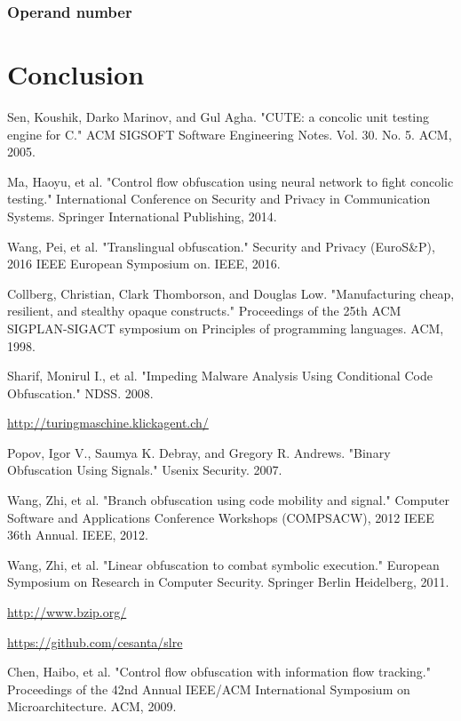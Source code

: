 \documentclass[lnicst]{svmultln}
\begin{document}
\subsubsection{Operand number}

\section{Conclusion}
 

%
%
\begin{thebibliography}{5}

 Sen, Koushik, Darko Marinov, and Gul Agha. "CUTE: a concolic unit testing engine for C." ACM SIGSOFT Software Engineering Notes. Vol. 30. No. 5. ACM, 2005.

 Ma, Haoyu, et al. "Control flow obfuscation using neural network to fight concolic testing." International Conference on Security and Privacy in Communication Systems. Springer International Publishing, 2014.

 Wang, Pei, et al. "Translingual obfuscation." Security and Privacy (EuroS\&P), 2016 IEEE European Symposium on. IEEE, 2016.

 Collberg, Christian, Clark Thomborson, and Douglas Low. "Manufacturing cheap, resilient, and stealthy opaque constructs." Proceedings of the 25th ACM SIGPLAN-SIGACT symposium on Principles of programming languages. ACM, 1998.

 Sharif, Monirul I., et al. "Impeding Malware Analysis Using Conditional Code Obfuscation." NDSS. 2008.


 \url{http://turingmaschine.klickagent.ch/}

 Popov, Igor V., Saumya K. Debray, and Gregory R. Andrews. "Binary Obfuscation Using Signals." Usenix Security. 2007.

 Wang, Zhi, et al. "Branch obfuscation using code mobility and signal." Computer Software and Applications Conference Workshops (COMPSACW), 2012 IEEE 36th Annual. IEEE, 2012.

 Wang, Zhi, et al. "Linear obfuscation to combat symbolic execution." European Symposium on Research in Computer Security. Springer Berlin Heidelberg, 2011.

 \url{http://www.bzip.org/}

 \url{https://github.com/cesanta/slre}

 Chen, Haibo, et al. "Control flow obfuscation with information flow tracking." Proceedings of the 42nd Annual IEEE/ACM International Symposium on Microarchitecture. ACM, 2009.


\end{thebibliography}
\end{document}

